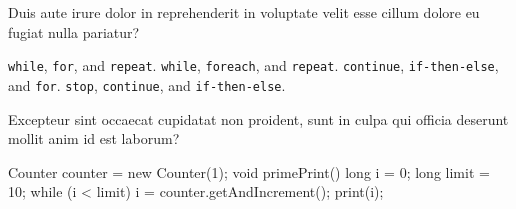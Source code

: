 \question 
{}
Duis aute irure dolor in reprehenderit in voluptate velit esse cillum dolore eu fugiat nulla pariatur?
\begin{choices}[2]
\CHOICE \texttt{while}, \texttt{for}, and \texttt{repeat}.
\choice \texttt{while}, \texttt{foreach}, and \texttt{repeat}.
\choice \texttt{continue}, \texttt{if-then-else}, and \texttt{for}.
\choice \texttt{stop}, \texttt{continue}, and \texttt{if-then-else}.
\end{choices}



\question 
\begin{splitquestion}{0.35} %
Excepteur sint occaecat cupidatat non proident, sunt in culpa qui officia deserunt mollit anim id est laborum?
\begin{choices}[4]
\end{choices}
\nextpart %
\begin{java}
Counter counter = new Counter(1);
void primePrint() {
  long i = 0;
  long limit = 10;
  while (i < limit) {
    i = counter.getAndIncrement();
    print(i);
  }
}  
\end{java}
\end{splitquestion}






